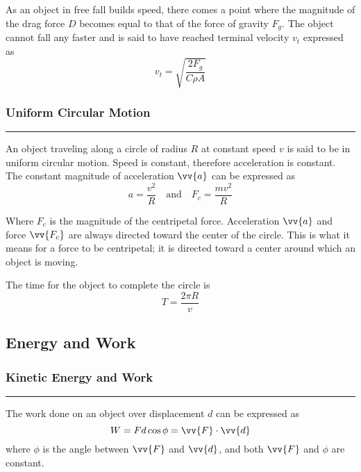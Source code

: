 \documentclass{article}
\begin{document}
    \smallskip\noindent
    As an object in free fall builds speed, there comes a point where the magnitude of the drag force ${D}$ becomes equal to that of the force of gravity $F_g$.
    The object cannot fall any faster and is said to have reached terminal velocity $v_t$ expressed as
    \[
        v_t = \sqrt{\frac{2F_g}{C\rho A}}
    \]

    \smallskip
    \subsubsection*{Uniform Circular Motion}
    \vspace{-1em}
    \rule{\linewidth}{.1mm}

    \smallskip\noindent
    An object traveling along a circle of radius $R$ at constant speed $v$ is said to be in uniform circular motion.
    Speed is constant, therefore acceleration is constant.
    The constant magnitude of acceleration $\vv{a}$ can be expressed as
    \[
        a=\frac{v^2}{R} \quad \text{and} \quad F_c=\frac{mv^2}{R}
    \]

    \smallskip\noindent
    Where $F_c$ is the magnitude of the centripetal force.
    Acceleration $\vv{a}$ and force $\vv{F_c}$ are always directed toward the center of the circle.
    This is what it means for a force to be centripetal; it is directed toward a center around which an object is moving.

    \medskip\noindent
    The time for the object to complete the circle is
    \[
        T = \frac{2\pi R}{v}
    \]

    \bigskip
    \begin{center}
        \subsection*{Energy and Work}
    \end{center}

    \smallskip
    \subsubsection*{Kinetic Energy and Work}
    \vspace{-1em}
    \rule{\linewidth}{.1mm}

    \smallskip\noindent
    The work done on an object over displacement $d$ can be expressed as
    \[
        W=Fd\cos\phi=\vv{F}\cdot\vv{d}
    \]
    \noindent
    where $\phi$ is the angle between $\vv{F}$ and $\vv{d}$, and both $\vv{F}$ and $\phi$ are constant.
\end{document}
